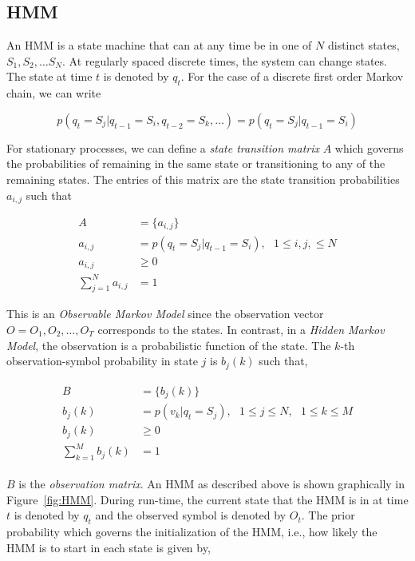 \begin{Body}
\subsection{HMM}
An HMM is a state machine that can at any time be in one of $N$ distinct states, $S_1, S_2, \ldots S_N$.  At regularly spaced discrete times, the system can change states.  The state at time $t$ is denoted by $q_t$.  For the case of a discrete first order Markov chain, we can write

\begin{equation}
p(q_t = S_j | q_{t-1}= S_i, q_{t-2}= S_k, \ldots)  = p(q_t = S_j | q_{t-1}= S_i)
\end{equation}

For stationary processes, we can define a \emph{state transition matrix} $A$ which governs the probabilities of remaining in the same state or transitioning to any of the remaining states.  The entries of this matrix are the state transition probabilities $a_{i,j}$ such that

\begin{equation}
\begin{array}{llllll}
A &= \{a_{i,j}\}\\
a_{i,j} &= p(q_t = S_j | q_{t-1}= S_i), \ \ \ 1 \leq i, j, \leq N\\
a_{i,j} &\geq 0\\
\sum\limits_{j=1}^N a_{i,j}&=1 
\end{array}
\end{equation}

This is an \emph{Observable Markov Model} since the observation vector $O=O_1, O_2, \ldots, O_T$ corresponds to the states.  In contrast, in a \emph{Hidden Markov Model}, the observation is a probabilistic function of the state.  The $k$-th observation-symbol probability in state $j$ is $b_j(k)$ such that,

\begin{align}
\begin{array}{llllll}
B&=\{b_j(k)\}\\
b_j(k) &= p(v_k | q_t=S_j), \ \ \ 1\leq j \leq N, \ \ \ 1\leq k \leq M \\
b_j(k) &\geq 0\\
\sum\limits_{k=1}^M b_j(k) &=1 
\end{array}
\end{align}

$B$ is the \emph{observation matrix}.  An HMM as described above is shown graphically in Figure~\ref{fig:HMM}.  During run-time, the current state that the HMM is in at time $t$ is denoted by $q_t$ and the observed symbol is denoted by $O_t$.  The prior probability which governs the initialization of the HMM, i.e., how likely the HMM is to start in each state is given by,


\end{Body}
